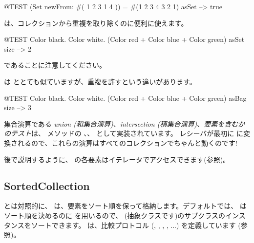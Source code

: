 \documentclass[a4paper,10pt,twoside]{book}
\begin{document}
\begin{code}{@TEST}
(Set newFrom: #( 1 2 3 1 4 )) = #(1 2 3 4 3 2 1) asSet --> true
\end{code}

 は、コレクションから重複を取り除くのに便利に使えます。
\begin{code}{@TEST}
{ Color black. Color white. (Color red + Color blue + Color green) } asSet size --> 2
\end{code}
\noindent
{} であることに注意してください。

 は  ととても似ていますが、重複を許すという違いがあります。
\begin{code}{@TEST}
{ Color black. Color white. (Color red + Color blue + Color green) } asBag size --> 3
\end{code}

集合演算である \emph{union (和集合演算)}、\emph{intersection (積集合演算)}、\emph{要素を含むかのテスト}は、 メソッドの 、、 として実装されています。
レシーバが最初に  に変換されるので、これらの演算はすべてのコレクションでちゃんと動くのです!


後で説明するように、 の各要素はイテレータでアクセスできます(参照)。

\subsection{SortedCollection}
 とは対照的に、 は、要素をソート順を保って格納します。デフォルトでは、 はソート順を決めるのに  を用いるので、 (抽象クラスです)のサブクラスのインスタンスをソートできます。 は、比較プロトコル (, , , , ...) を定義しています
(参照)。
\end{document}
